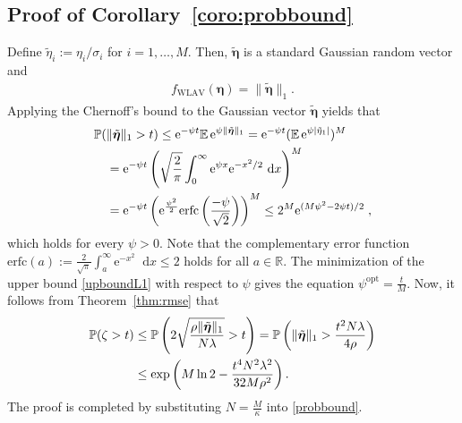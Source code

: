 \documentclass[journal,twoside]{IEEEtran}
\newcommand{\diff}{\mathop{}\mathrm{d}}
\newcommand{\bmeta}{\bm{\eta}}
\newcommand{\tbmeta}{\tilde{\bmeta}}
\newcommand{\myexp}{\mathrm{e}}
\begin{document}
\subsection{Proof of Corollary~\ref{coro:probbound}}\label{appendix:probbound}
Define $\tilde{\eta}_i:=\eta_i/\sigma_i$ for $i=1,\ldots,M$. Then, $\tilde{\boldsymbol{\eta}}$ is a standard Gaussian random vector and
\begin{align}	
f_{\mathrm{WLAV}}(\boldsymbol{\eta})=\|\tilde{\boldsymbol{\eta}}\|_1.
\end{align}
Applying the Chernoff's bound \cite{Boucheron} to the  Gaussian vector $\tbmeta$ yields that
\begin{align}
   \mathbb{P}(&\|\tbmeta\|_1>t) \leq \myexp^{-\psi t}\mathbb{E}\, \myexp^{\psi \|\tbmeta\|_1}\notag = \myexp^{-\psi t}(\mathbb{E}\, \myexp^{\psi |\tilde{\eta}_1|})^M \notag \\
   &= \myexp^{-\psi t}\left(\sqrt{\frac{2}{\pi}}\int_0^{\infty}\myexp^{\psi x}\myexp^{-x^2/2}\diff x\right)^M \notag \\
   &= \myexp^{-\psi t}\left(\myexp^{\frac{\psi^2}{2}}\mathrm{erfc}\left(\frac{-\psi}{\sqrt{2}}\right)\right)^M
   \leq 2^M \myexp^{(M\psi^2-2\psi t)/2}\; , \label{upboundL1}
\end{align}
which holds for every $\psi>0$. Note that the complementary error function $\mathrm{erfc}(a) := \frac{2}{\sqrt{\pi}}\int_a^{\infty}\myexp^{-x^2}\diff x \leq 2$ holds for all $a\in \mathbb{R}$.
The minimization of the upper bound \eqref{upboundL1} with respect to $\psi$  gives  the equation $\psi^{\mathrm{opt}} =\frac{t}{M}$. Now, it follows from Theorem~\ref{thm:rmse}  that
\begin{align} \label{probbound}
\mathbb{P}(\zeta>t) &\leq \mathbb{P}\left(2\sqrt{\frac{\rho \|\tbmeta\|_{1} }{N\lambda}}>t\right) = \mathbb{P}\left(\|\tbmeta\|_{1}> \frac{t^2 N\lambda}{4\rho}\right) \notag \\
&\leq \exp\left(M\ln2-\frac{t^4 N^2\lambda^2}{32M\rho^2} \right).
\end{align}
The proof is completed by substituting $N = \frac{M}{\kappa}$ into \eqref{probbound}.




\end{document}

